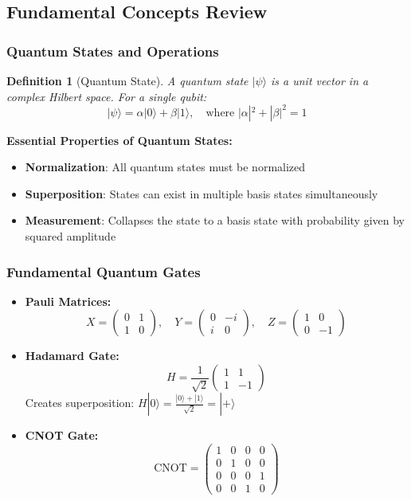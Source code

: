 \documentclass{article}
\newtheorem{definition}[theorem]{Definition}
\begin{document}
\subsection{Fundamental Concepts Review}

\subsubsection{Quantum States and Operations}
\begin{definition}[Quantum State]
A quantum state \(|\psi\rangle\) is a unit vector in a complex Hilbert space. For a single qubit:
\[
|\psi\rangle = \alpha|0\rangle + \beta|1\rangle, \quad \text{where } |\alpha|^2 + |\beta|^2 = 1
\]
\end{definition}

\begin{conceptbox}
\textbf{Essential Properties of Quantum States:}
\begin{itemize}
    \item \textbf{Normalization}: All quantum states must be normalized
    \item \textbf{Superposition}: States can exist in multiple basis states simultaneously
    \item \textbf{Measurement}: Collapses the state to a basis state with probability given by squared amplitude
\end{itemize}
\end{conceptbox}

\subsubsection{Fundamental Quantum Gates}
\begin{itemize}
    \item \textbf{Pauli Matrices:}
    \[
    X = \begin{pmatrix} 0 & 1 \\ 1 & 0 \end{pmatrix}, \quad
    Y = \begin{pmatrix} 0 & -i \\ i & 0 \end{pmatrix}, \quad
    Z = \begin{pmatrix} 1 & 0 \\ 0 & -1 \end{pmatrix}
    \]
    
    \item \textbf{Hadamard Gate:}
    \[
    H = \frac{1}{\sqrt{2}} \begin{pmatrix} 1 & 1 \\ 1 & -1 \end{pmatrix}
    \]
    Creates superposition: \(H|0\rangle = \frac{|0\rangle + |1\rangle}{\sqrt{2}} = |+\rangle\)
    
    \item \textbf{CNOT Gate:}
    \[
    \text{CNOT} = \begin{pmatrix} 1 & 0 & 0 & 0 \\ 0 & 1 & 0 & 0 \\ 0 & 0 & 0 & 1 \\ 0 & 0 & 1 & 0 \end{pmatrix}
    \]
\end{itemize}
\end{document}
